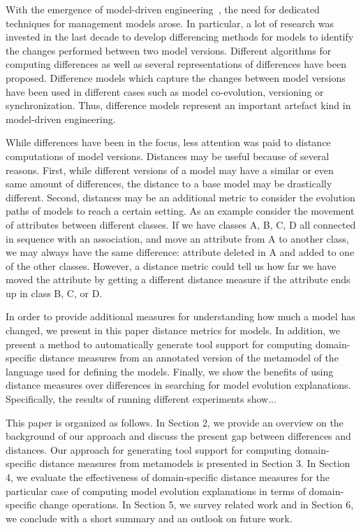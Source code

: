 With the emergence of model-driven engineering~\cite{}, the need for dedicated techniques for management models arose. In particular, a lot of research was invested in the last decade to develop differencing methods for models to identify the changes performed between two model versions. Different algorithms for computing differences as well as several representations of differences have been proposed. Difference models which capture the changes between model versions have been used in different cases such as model co-evolution, versioning or synchronization. 
Thus, difference models represent an important artefact kind in model-driven engineering. 

While differences have been in the focus, less attention was paid to distance computations of model versions. Distances may be useful because of several reasons. First, while different versions of a model may have a similar or even same amount of differences, the distance to a base model may be drastically different. Second, distances may be an additional metric to consider the evolution paths of models to reach a certain setting. As an example consider the movement of attributes between different classes. If we have classes A, B, C, D all connected in sequence with an association, and move an attribute from A to another class, we may always have the same difference: attribute deleted in A and added to one of the other classes. However, a distance metric could tell us how far we have moved the attribute by getting a different distance measure if the attribute ends up in class B, C, or D.  

In order to provide additional measures for understanding how much a model has changed, we present in this paper distance metrics for models. In addition, we present a method to automatically generate tool support for computing domain-specific distance measures from an annotated version of the metamodel of the language used for defining the models. Finally, we show the benefits of using distance measures over differences in searching for model evolution explanations. Specifically, the results of running different experiments show...

This paper is organized as follows. In Section 2, we provide an overview on the background of our approach and discuss the present gap between differences and distances. Our approach for generating tool support for computing domain-specific distance measures from metamodels is presented in Section 3. In Section 4, we evaluate the effectiveness of domain-specific distance measures for the particular case of computing model evolution explanations in terms of domain-specific change operations. In Section 5, we survey related work and in Section 6, we conclude with a short summary and an outlook on future work. 
